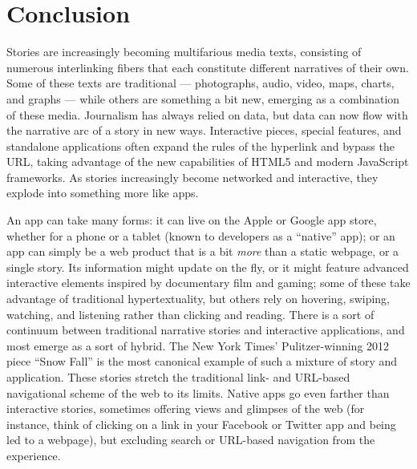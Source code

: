 \chapter{Conclusion}


Stories are increasingly becoming multifarious media texts, consisting of numerous interlinking fibers that each constitute different narratives of their own. Some of these texts are traditional --- photographs, audio, video, maps, charts, and graphs --- while others are something a bit new, emerging as a combination of these media. Journalism has always relied on data, but data can now flow with the narrative arc of a story in new ways. Interactive pieces, special features, and standalone applications often expand the rules of the hyperlink and bypass the URL, taking advantage of the new capabilities of HTML5 and modern JavaScript frameworks. As stories increasingly become networked and interactive, they explode into something more like apps.

An app can take many forms: it can live on the Apple or Google app store, whether for a phone or a tablet (known to developers as a ``native'' app); or an app can simply be a web product that is a bit \emph{more} than a static webpage, or a single story. Its information might update on the fly, or it might feature advanced interactive elements inspired by documentary film and gaming; some of these take advantage of traditional hypertextuality, but others rely on hovering, swiping, watching, and listening rather than clicking and reading. There is a sort of continuum between traditional narrative stories and interactive applications, and most emerge as a sort of hybrid. The New York Times' Pulitzer-winning 2012 piece ``Snow Fall'' is the most canonical example of such a mixture of story and application.\autocite{branch_snow_2012} These stories stretch the traditional link- and URL-based navigational scheme of the web to its limits. Native apps go even farther than interactive stories, sometimes offering views and glimpses of the web (for instance, think of clicking on a link in your Facebook or Twitter app and being led to a webpage), but excluding search or URL-based navigation from the experience.

